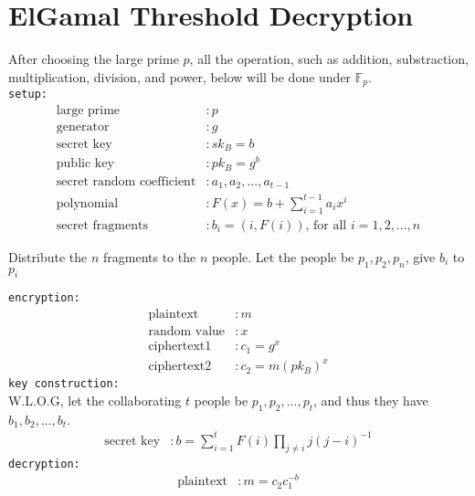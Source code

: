 \documentclass[12pt,a4paper]{article}
\begin{document}
\section{ElGamal Threshold Decryption}
    After choosing the large prime $p$, all the operation, such as addition, substraction, multiplication, division, and power, below will be done under $\mathbb{F}_p$.\\
    \texttt{setup: }
    \begin{align*}
        \text{large prime}&: p\\
        \text{generator}&: g\\
        \text{secret key}&: sk_B=b\\
        \text{public key}&: pk_B=g^b\\
        \text{secret random coefficient}&: a_1, a_2, ..., a_{t-1}\\
        \text{polynomial}&: F(x)=b+\sum\limits_{i=1}^{t-1}a_ix^i\\
        \text{secret fragments}&: b_i=(i,F(i))\text{, for all $i = 1, 2, ...,n$}
    \end{align*}
    \begin{center}Distribute the $n$ fragments to the $n$ people. Let the people be $p_1, p_2, p_n$, give $b_i$ to $p_i$\end{center}
    \texttt{encryption: }
    \begin{align*}
        \text{plaintext}&: m\\
        \text{random value}&: x\\
        \text{ciphertext1}&:c_1=g^x\\
        \text{ciphertext2}&:c_2=m(pk_B)^x
    \end{align*}
    \texttt{key construction:}\\
        W.L.O.G, let the collaborating $t$ people be $p_1, p_2, ..., p_t$, and thus they have $b_1, b_2, ..., b_t$.
    \begin{align*}
        \text{secret key}&: b=\sum\limits_{i=1}^{t}F(i)\prod\limits_{j\neq i}j(j-i)^{-1}
    \end{align*}
    \texttt{decryption: }
    \begin{align*}
        \text{plaintext}&: m=c_2c_1^{-b}
    \end{align*}
\end{document}
